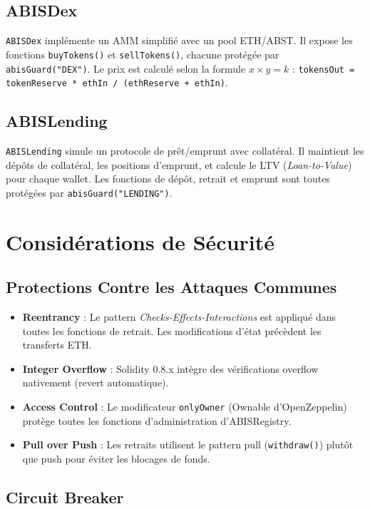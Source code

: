 \documentclass[12pt,a4paper]{report}
\newcommand{\code}[1]{\texttt{#1}}
\begin{document}
\subsection{ABISDex}

\code{ABISDex} implémente un AMM simplifié avec un pool ETH/ABST. Il expose les fonctions \code{buyTokens()} et \code{sellTokens()}, chacune protégée par \code{abisGuard("DEX")}. Le prix est calculé selon la formule $x \times y = k$ : \texttt{tokensOut = tokenReserve * ethIn / (ethReserve + ethIn)}.

\subsection{ABISLending}

\code{ABISLending} simule un protocole de prêt/emprunt avec collatéral. Il maintient les dépôts de collatéral, les positions d'emprunt, et calcule le LTV (\textit{Loan-to-Value}) pour chaque wallet. Les fonctions de dépôt, retrait et emprunt sont toutes protégées par \code{abisGuard("LENDING")}.

\section{Considérations de Sécurité}

\subsection{Protections Contre les Attaques Communes}

\begin{itemize}
  \item \textbf{Reentrancy} : Le pattern \textit{Checks-Effects-Interactions} est appliqué dans toutes les fonctions de retrait. Les modifications d'état précèdent les transferts ETH.
  \item \textbf{Integer Overflow} : Solidity 0.8.x intègre des vérifications overflow nativement (revert automatique).
  \item \textbf{Access Control} : Le modificateur \code{onlyOwner} (Ownable d'OpenZeppelin) protège toutes les fonctions d'administration d'ABISRegistry.
  \item \textbf{Pull over Push} : Les retraits utilisent le pattern pull (\code{withdraw()}) plutôt que push pour éviter les blocages de fonds.
\end{itemize}

\subsection{Circuit Breaker}
\end{document}
